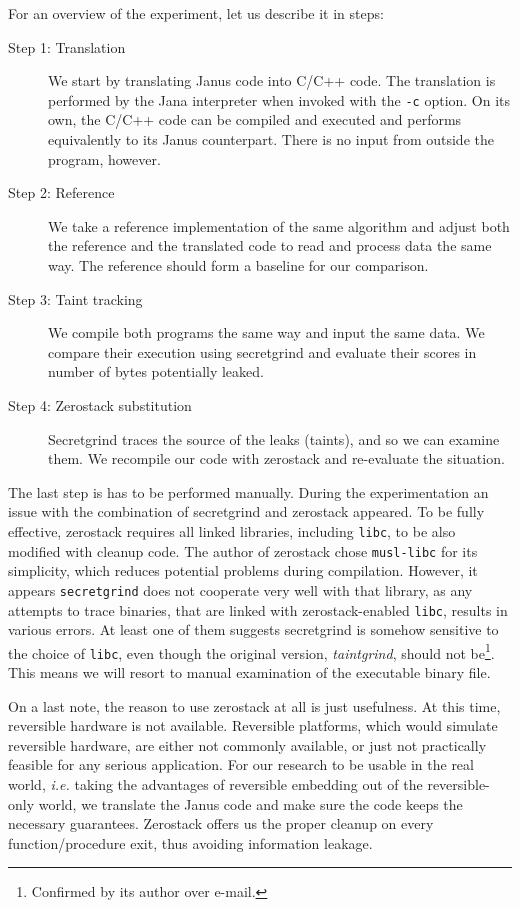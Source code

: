 \documentclass[a4paper,10pt,openright]{memoir}
\newcommand{\ie}{\emph{i.e.}\xspace}
\newcommand{\term}[1]{\textit{#1}}
\newcommand{\code}[1]{\texttt{#1}}
\begin{document}
For an overview of the experiment, let us describe it in steps:

\begin{description}

\item[Step 1: Translation] We start by translating Janus code into 
C/C++ code. The translation is performed by the Jana interpreter when 
invoked with the \code{-c} option. On its own, the C/C++ code can be 
compiled and executed and performs equivalently to its Janus 
counterpart. There is no input from outside the program, however.

\item[Step 2: Reference] We take a reference implementation of the same 
algorithm and adjust both the reference and the translated code to read 
and process data the same way. The reference should form a baseline for 
our comparison.

\item[Step 3: Taint tracking] We compile both programs the same way and 
input the same data. We compare their execution using 
secretgrind and evaluate their scores in number of bytes 
potentially leaked.

\item[Step 4: Zerostack substitution] Secretgrind traces the source of 
the leaks (taints), and so we can examine them. We recompile our code 
with zerostack and re-evaluate the situation.

\end{description}

The last step is has to be performed manually. During the 
experimentation an issue with the combination of secretgrind and 
zerostack appeared. To be fully effective, zerostack requires all 
linked libraries, including \code{libc}, to be also modified with 
cleanup code. The author of zerostack chose \code{musl-libc} for its 
simplicity, which reduces potential problems during compilation. 
However, it appears \code{secretgrind} does not cooperate very well 
with that library, as any attempts to trace binaries, that are linked 
with zerostack-enabled \code{libc}, results in various errors. At least 
one of them suggests secretgrind is somehow sensitive to the choice of 
\code{libc}, even though the original version, \term{taintgrind}, 
should not be\footnote{Confirmed by its author over e-mail.}. This 
means we will resort to manual examination of the executable binary 
file.

On a last note, the reason to use zerostack at all is just 
usefulness. At this time, reversible hardware is not available. 
Reversible platforms, which would simulate reversible hardware, are 
either not commonly available, or just not practically feasible for any 
serious application. For our research to be usable in the real world, 
\ie taking the advantages of reversible embedding out of the 
reversible-only world, we translate the Janus code and make sure the 
code keeps the necessary guarantees. Zerostack offers us the 
proper cleanup on every function/procedure exit, thus avoiding 
information leakage.
\end{document}
